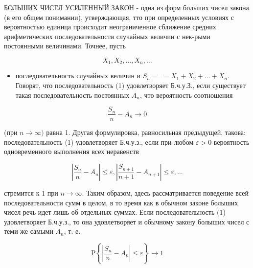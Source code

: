 \documentclass[10pt]{article}
\begin{document}
БОЛЬШИХ ЧИСЕЛ УСИЛЕННЫЙ ЗАКОН - одна из форм больших чисел закона (в его общем понимании), утверждающая, тто при определенных условиях с вероятностью единица происходит неограниченное сближение средних арифметических последовательности случайных величин с нек-рыми постоянными величинами. Точнее, пусть



\[

X_{1}, X_{2}, \ldots, X_{n}, \ldots

\]



\begin{itemize}

  \item последовательность случайных величин и $S_{n}=$ $=X_{1}+X_{2}+\ldots+X_{n}$. Говорят, что последовательность (1) удовлетворяет Б.ч.у.З., если существует такая последовательность постоянных $A_{n}$, что вероятность соотношения

\end{itemize}



\[

\frac{S_{n}}{n}-A_{n} \longrightarrow 0

\]



(при $n \rightarrow \infty)$ равна 1. Другая формулировка, равносильная предыдущей, такова: последовательность (1) удовлетворяет Б.ч.у.з., если при любом $\varepsilon>0$ вероятность одновременного выполнения всех неравенств



\[

\left|\frac{S_{n}}{n}-A_{n}\right| \leqslant \varepsilon,\left|\frac{S_{n+1}}{n+1}-A_{n+1}\right| \leqslant \varepsilon, \ldots

\]



стремится к 1 при $n \rightarrow \infty$. Таким образом, здесь рассматривается поведение всей последовательности сумм в целом, в то время как в обычном законе болыших чисел речь идет лишь об отдельных суммах. Если последовательность (1) удовлетворяет Б.ч.у.з., то она удовлетворяет и обычному закону болыших чисел с теми же самыми $A_{n}$, т. е.



\[

\mathrm{P}\left\{\left|\frac{S_{n}}{n}-A_{n}\right| \leqslant \varepsilon\right\} \rightarrow 1

\]
\end{document}
